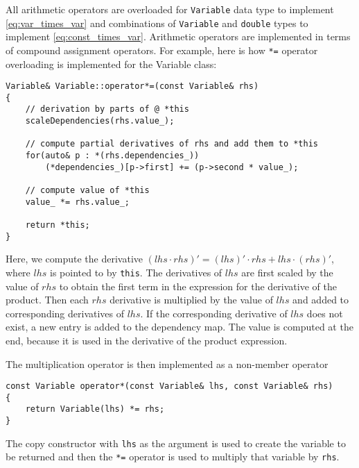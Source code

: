 \documentclass[10pt]{ijnam}
\theoremstyle{definition}
\begin{document}
All arithmetic operators are overloaded for \verb|Variable| data type to implement 
\eqref{eq:var_times_var} and combinations of \verb|Variable| and \verb|double| 
types to implement \eqref{eq:const_times_var}.
Arithmetic operators are implemented in terms of compound assignment operators. For 
example, here is how \texttt{*=} operator overloading is implemented for the Variable class:
\begin{lstlisting}
Variable& Variable::operator*=(const Variable& rhs)
{
    // derivation by parts of @ *this
    scaleDependencies(rhs.value_);

    // compute partial derivatives of rhs and add them to *this
    for(auto& p : *(rhs.dependencies_))
        (*dependencies_)[p->first] += (p->second * value_);

    // compute value of *this
    value_ *= rhs.value_;

    return *this;
}
\end{lstlisting}
Here, we compute the derivative $(lhs \cdot rhs)' = (lhs)' \cdot rhs + lhs \cdot (rhs)'$, where $lhs$ is pointed to by \texttt{this}. The derivatives of $lhs$ are first scaled by the value
of $rhs$ to obtain the first term in the expression for the derivative of the product. 
Then each $rhs$ derivative is multiplied by the value of $lhs$ and added to corresponding
derivatives of $lhs$. If the corresponding derivative of $lhs$ does not exist,
a new entry is added to the dependency map.
The value is computed at the end, because it is used in the
derivative of the product expression.

The multiplication operator is then implemented as a non-member operator
\begin{lstlisting}
const Variable operator*(const Variable& lhs, const Variable& rhs)
{
    return Variable(lhs) *= rhs;
}
\end{lstlisting}
The copy constructor with \texttt{lhs} as the argument is used to create the variable to be 
returned and then the \texttt{*=} operator is used to multiply that variable by \texttt{rhs}.
\end{document}
